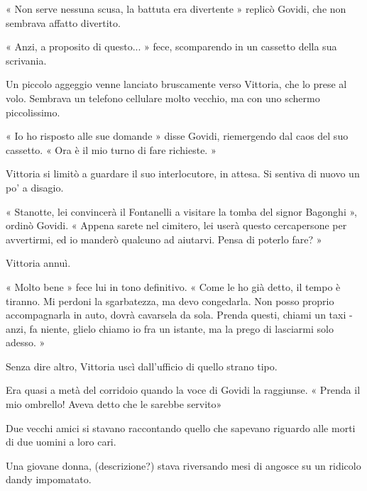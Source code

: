 « Non serve nessuna scusa, la battuta era divertente » replicò Govidi, che non sembrava affatto divertito.

« Anzi, a proposito di questo... » fece, scomparendo in un cassetto della sua scrivania.

Un piccolo aggeggio venne lanciato bruscamente verso Vittoria, che lo prese al volo. Sembrava un telefono cellulare molto vecchio, ma con uno schermo piccolissimo.

« Io ho risposto alle sue domande » disse Govidi, riemergendo dal caos del suo cassetto. « Ora è il mio turno di fare richieste. »

Vittoria si limitò a guardare il suo interlocutore, in attesa. Si sentiva di nuovo un po' a disagio.

« Stanotte, lei convincerà il Fontanelli a visitare la tomba del signor Bagonghi », ordinò Govidi. « Appena sarete nel cimitero, lei userà questo cercapersone per avvertirmi, ed io manderò qualcuno ad aiutarvi. Pensa di poterlo fare? »

Vittoria annuì.

« Molto bene » fece lui in tono definitivo. « Come le ho già detto, il tempo è tiranno. Mi perdoni la sgarbatezza, ma devo congedarla. Non posso proprio accompagnarla in auto, dovrà cavarsela da sola. Prenda questi, chiami un taxi - anzi, fa niente, glielo chiamo io fra un istante, ma la prego di lasciarmi solo adesso. »

Senza dire altro, Vittoria uscì dall'ufficio di quello strano tipo.

Era quasi a metà del corridoio quando la voce di Govidi la raggiunse. « Prenda il mio ombrello! Aveva detto che le sarebbe servito»




Due vecchi amici si stavano raccontando quello che sapevano riguardo alle morti di due uomini a loro cari.

Una giovane donna, (descrizione?) stava riversando mesi di angosce su un ridicolo dandy impomatato.

